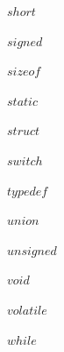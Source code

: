  			\begin{minipage}[c]{2.2 cm}
	 			\begin{compactitem}		 
	 			 	\item $short$ 			 	
	 			 	\item $signed$ 			 	
	 			 	\item $sizeof$ 			 	
	 			 	\item $static$	
	 			\end{compactitem}
	 		\end{minipage}
 			\begin{minipage}[c]{2.2 cm}
	 			\begin{compactitem}		 	
	 			 	\item $struct$ 		 	
	 			 	\item $switch$ 			 	
	 			 	\item $typedef$ 			 	
	 			 	\item $union$ 			 	
	 			\end{compactitem}
	 		\end{minipage}
 			\begin{minipage}[c]{2.4 cm}
	 			\begin{compactitem}		 	
	 			 	\item $unsigned$ 			 	
	 			 	\item $void$	
	 			 	\item $volatile$		 	
	 			 	\item $while$
	 			\end{compactitem}
	 		\end{minipage}
	 		
